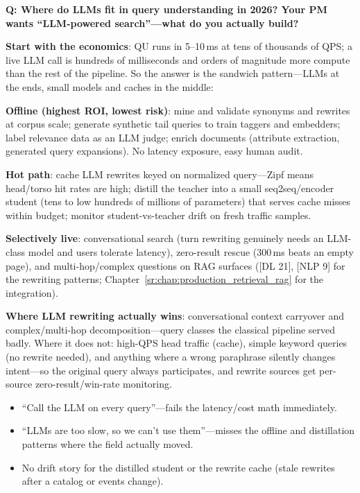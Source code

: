 
\begin{interviewq}
\textbf{Q: Where do LLMs fit in query understanding in 2026? Your PM wants ``LLM-powered search''---what do you actually build?}

 \quad {} \quad \badgefreq{\freqmed}

\stronganswer

\textbf{Start with the economics}: QU runs in 5--10\,ms at tens of thousands of QPS; a live LLM call is hundreds of milliseconds and orders of magnitude more compute than the rest of the pipeline. So the answer is the sandwich pattern---LLMs at the ends, small models and caches in the middle:

\textbf{Offline (highest ROI, lowest risk)}: mine and validate synonyms and rewrites at corpus scale; generate synthetic tail queries to train taggers and embedders; label relevance data as an LLM judge; enrich documents (attribute extraction, generated query expansions). No latency exposure, easy human audit.

\textbf{Hot path}: cache LLM rewrites keyed on normalized query---Zipf means head/torso hit rates are high; distill the teacher into a small seq2seq/encoder student (tens to low hundreds of millions of parameters) that serves cache misses within budget; monitor student-vs-teacher drift on fresh traffic samples.

\textbf{Selectively live}: conversational search (turn rewriting genuinely needs an LLM-class model and users tolerate latency), zero-result rescue (300\,ms beats an empty page), and multi-hop/complex questions on RAG surfaces ([DL 21], [NLP 9] for the rewriting patterns; Chapter~\ref{sr:chap:production_retrieval_rag} for the integration).

\textbf{Where LLM rewriting actually wins}: conversational context carryover and complex/multi-hop decomposition---query classes the classical pipeline served badly. Where it does not: high-QPS head traffic (cache), simple keyword queries (no rewrite needed), and anything where a wrong paraphrase silently changes intent---so the original query always participates, and rewrite sources get per-source zero-result/win-rate monitoring.

\redflags
\begin{itemize}
    \item ``Call the LLM on every query''---fails the latency/cost math immediately.
    \item ``LLMs are too slow, so we can't use them''---misses the offline and distillation patterns where the field actually moved.
    \item No drift story for the distilled student or the rewrite cache (stale rewrites after a catalog or events change).
\end{itemize}


\end{interviewq}
